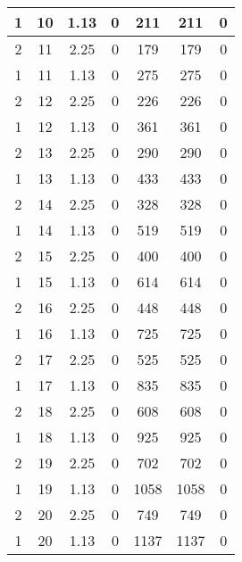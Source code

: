 \documentclass[letterpaper, 12pt]{article}
\begin{document}
\begin{longtable}{|c|c|c|c|c|c|c|}
\hline
1 & 10 & 1.13 & 0 & 211 & 211 & 0 \\
\hline
2 & 11 & 2.25 & 0 & 179 & 179 & 0 \\
\hline
1 & 11 & 1.13 & 0 & 275 & 275 & 0 \\
\hline
2 & 12 & 2.25 & 0 & 226 & 226 & 0 \\
\hline
1 & 12 & 1.13 & 0 & 361 & 361 & 0 \\
\hline
2 & 13 & 2.25 & 0 & 290 & 290 & 0 \\
\hline
1 & 13 & 1.13 & 0 & 433 & 433 & 0 \\
\hline
2 & 14 & 2.25 & 0 & 328 & 328 & 0 \\
\hline
1 & 14 & 1.13 & 0 & 519 & 519 & 0 \\
\hline
2 & 15 & 2.25 & 0 & 400 & 400 & 0 \\
\hline
1 & 15 & 1.13 & 0 & 614 & 614 & 0 \\
\hline
2 & 16 & 2.25 & 0 & 448 & 448 & 0 \\
\hline
1 & 16 & 1.13 & 0 & 725 & 725 & 0 \\
\hline
2 & 17 & 2.25 & 0 & 525 & 525 & 0 \\
\hline
1 & 17 & 1.13 & 0 & 835 & 835 & 0 \\
\hline
2 & 18 & 2.25 & 0 & 608 & 608 & 0 \\
\hline
1 & 18 & 1.13 & 0 & 925 & 925 & 0 \\
\hline
2 & 19 & 2.25 & 0 & 702 & 702 & 0 \\
\hline
1 & 19 & 1.13 & 0 & 1058 & 1058 & 0 \\
\hline
2 & 20 & 2.25 & 0 & 749 & 749 & 0 \\
\hline
1 & 20 & 1.13 & 0 & 1137 & 1137 & 0 \\
\hline
\end{longtable}
\end{document}

